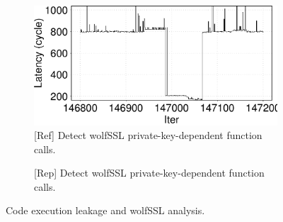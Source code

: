 \begin{figure}[ht]
    \centering
    \begin{subfigure}[t]{.24\linewidth}
        \centering
        \includegraphics[width=\linewidth]{figure/plot/reference/fig15-fp-exptmod.tikz.pdf}
        \caption{[Ref] Detect wolfSSL private-key-dependent function calls.}
        \label{fig:15:ref:shared-lib-wolfssl-fp-exptmod}
    \end{subfigure}
    \hfill
    \begin{subfigure}[t]{.24\linewidth}
        \centering
        \caption{[Rep] Detect wolfSSL private-key-dependent function calls.}
        \label{fig:15:rep:shared-lib-wolfssl-fp-exptmod}
    \end{subfigure}
    \caption{Code execution leakage and wolfSSL analysis.}
    \label{fig:15:code-execution-leak}
\end{figure}
